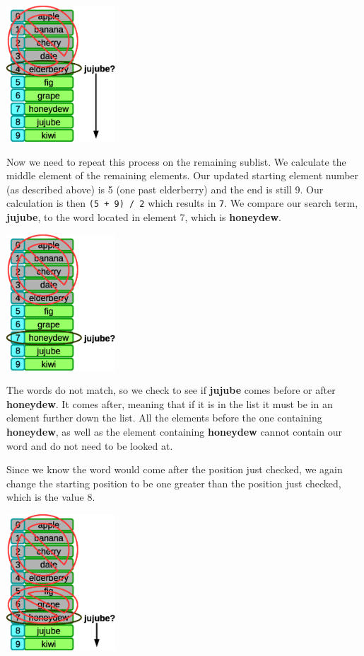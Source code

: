 \beforefig
\centerline{\includegraphics[height=2in]{figs2/recursion-binsearch-success-2.eps}}
\afterfig

Now we need to repeat this process on the remaining sublist. We calculate the middle element of the remaining elements. Our updated starting element number (as described above) is 5 (one past elderberry) and the end is still 9. Our calculation is then \texttt{(5 + 9) / 2} which results in \texttt{7}. We compare our search term, \textbf{jujube}, to the word located in element 7, which is \textbf{honeydew}.

\beforefig
\centerline{\includegraphics[height=2in]{figs2/recursion-binsearch-success-3.eps}}
\afterfig

The words do not match, so we check to see if \textbf{jujube} comes before or after \textbf{honeydew}. It comes after, meaning that if it is in the list it must be in an element further down the list. All the elements before the one containing \textbf{honeydew}, as well as the element containing \textbf{honeydew} cannot contain our word and do not need to be looked at.

Since we know the word would come after the position just checked, we again change the starting position to be one greater than the position just checked, which is the value  8.

\beforefig
\centerline{\includegraphics[height=2in]{figs2/recursion-binsearch-success-4.eps}}
\afterfig

